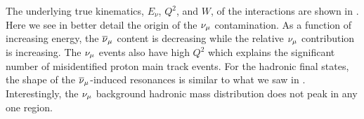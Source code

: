 The underlying true kinematics, $E_{\nu}$, $Q^{2}$, and $W$, of
the interactions are shown in .
Here we see in better detail the origin of the $\nu_{\mu}$ contamination.
As a function of increasing energy, the $\overline{\nu}_{\mu}$ content is decreasing
while the relative $\nu_{\mu}$ contribution is increasing. The $\nu_{\mu}$
events also have high $Q^{2}$ which explains the significant number
of misidentified proton main track events. For the hadronic final
states, the shape of the $\overline{\nu}_{\mu}$-induced resonances is similar
to what we saw in . Interestingly,
the $\nu_{\mu}$ background hadronic mass distribution does not peak in
any one region.

\begin{figure}
\begin{centering}
\end{centering}
\end{figure}
